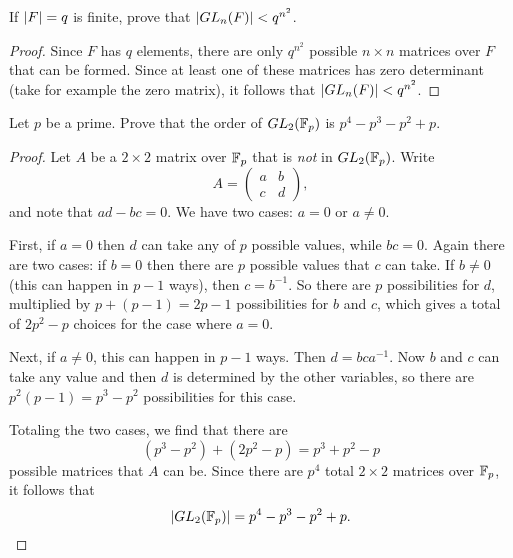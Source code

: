  If $\lvert{F}\rvert = q$ is finite, prove that
$\lvert{GL_n(F)}\rvert < q^{n^2}$.
\begin{proof}
  Since $F$ has $q$ elements, there are only $q^{n^2}$ possible
  $n\times n$ matrices over $F$ that can be formed. Since at least one
  of these matrices has zero determinant (take for example the zero
  matrix), it follows that $\lvert{GL_n(F)}\rvert < q^{n^2}$.
\end{proof}

 Let $p$ be a prime. Prove that the order of $GL_2(\mathbb{F}_p)$ is
$p^4 - p^3 - p^2 + p$.
\begin{proof}
  Let $A$ be a $2\times2$ matrix over $\mathbb{F}_p$ that is {\em not} in
  $GL_2(\mathbb{F}_p)$. Write
  \begin{equation*}
    A =
    \begin{pmatrix}
      a & b \\
      c & d
    \end{pmatrix},
  \end{equation*}
  and note that $ad - bc = 0$. We have two cases: $a = 0$ or
  $a\neq0$.

  First, if $a = 0$ then $d$ can take any of $p$ possible values,
  while $bc = 0$. Again there are two cases: if $b = 0$ then there are
  $p$ possible values that $c$ can take. If $b \neq 0$ (this can
  happen in $p-1$ ways), then $c = b^{-1}$. So there are $p$
  possibilities for $d$, multiplied by $p + (p - 1) = 2p - 1$
  possibilities for $b$ and $c$, which gives a total of $2p^2 - p$
  choices for the case where $a = 0$.

  Next, if $a \neq 0$, this can happen in $p - 1$ ways. Then
  $d = bca^{-1}$. Now $b$ and $c$ can take any value and then $d$ is
  determined by the other variables, so there are
  $p^2(p-1) = p^3 - p^2$ possibilities for this case.

  Totaling the two cases, we find that there are
  \begin{equation*}
    (p^3 - p^2) + (2p^2 - p) = p^3 + p^2 - p
  \end{equation*}
  possible matrices that $A$ can be. Since there are $p^4$ total
  $2\times2$ matrices over $\mathbb{F}_p$, it follows that
  \begin{equation*}
    \lvert{GL_2(\mathbb{F}_p)}\rvert = p^4 - p^3 - p^2 + p. \qedhere
  \end{equation*}
\end{proof}

